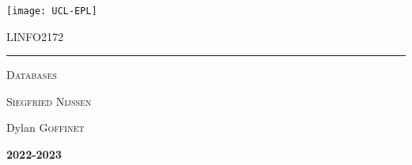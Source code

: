 \documentclass{customSynthesis}
\begin{document}

\begin{titlepage}
	\flushleft\texttt{[image: UCL-EPL]}\\
	\vspace*{2cm}
	\vspace*{\fill}
	\centering
	{\scshape\LARGE LINFO2172 \par}
	\vspace{0.4cm}
	{\color{clearBlue}\rule{0.7\textwidth}{1pt}\par}
	\vspace{0.5cm}
	{\scshape\Large Databases \par}
	\vspace{0.5cm}
	{\scshape\large Siegfried Nijssen\par}
	\vspace{1cm}
	{\scshape\large  \par} %
	{\Large\itshape\par}
	\vspace*{\fill}
	\vfill
	\vfill
	{\Large Dylan \textsc{Goffinet}\par}
	\vspace{0.5cm}
	{\Large\bfseries 2022-2023\par}
	{\large \par}
\end{titlepage}


\setcounter{tocdepth}{2} %
\tableofcontents
\thispagestyle{empty} %
\clearpage
{}




\end{document}
